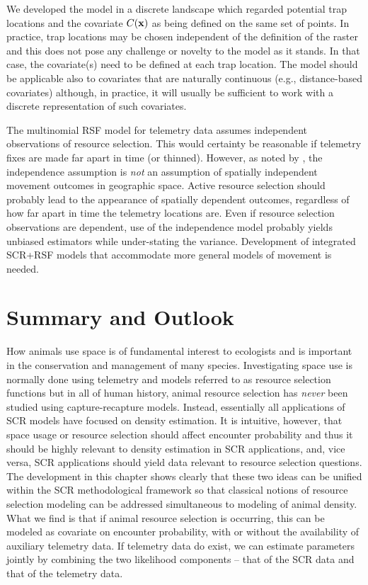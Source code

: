 We developed the model in a discrete landscape which regarded
potential trap
locations and the covariate $C({\bf x})$ as being defined on the same
set of points. In practice, trap locations may be chosen
independent of the definition of the raster and this does not pose any
challenge or novelty to the model as it stands. In that
case, the covariate(s) need to be defined at each trap location.
The model should be applicable also to covariates that are naturally
continuous (e.g., distance-based covariates) although, in practice, it
will usually be sufficient to work with a discrete representation of
such covariates.

The multinomial RSF model for telemetry data assumes independent
observations of resource selection.  This would certainty be
reasonable if telemetry fixes are made far apart in time (or thinned).
However, as noted by \citet{royle_etal:2012mee}, the independence
assumption is {\it not} an assumption of spatially independent
movement outcomes in geographic space.  Active resource selection
should probably lead to the appearance of spatially dependent
outcomes, regardless of how far apart in time the telemetry locations
are.  Even if resource selection observations are dependent, use of
the independence model probably yields unbiased estimators while
under-stating the variance.  Development of integrated SCR+RSF models
that accommodate more general models of movement is needed.




\section{Summary and Outlook}


How animals use space is of fundamental interest to ecologists and is
important in the conservation and management of many
species. Investigating space use is normally done using telemetry and
models referred to as resource selection functions
\citep{manly_etal:2002} but in all of human %
history, animal resource selection has {\it never} been studied using
capture-recapture models. Instead, essentially all applications of SCR
models have focused on density estimation.  It is intuitive, however,
that space usage or resource selection should affect encounter probability and thus it
should be highly relevant to density estimation in SCR applications,
and, vice versa, SCR applications should yield data relevant to
resource selection questions. The development in this chapter shows
clearly that these two ideas can be unified within the SCR
methodological framework so that classical notions of resource
selection modeling can be addressed simultaneous to modeling of
animal density. What we find is that if animal resource selection is
occurring, this can be modeled as covariate on encounter probability,
with or without the availability of auxiliary telemetry data. If
telemetry data do exist, we can estimate parameters jointly by
combining the two likelihood components -- that of the SCR data and
that of the telemetry data.

